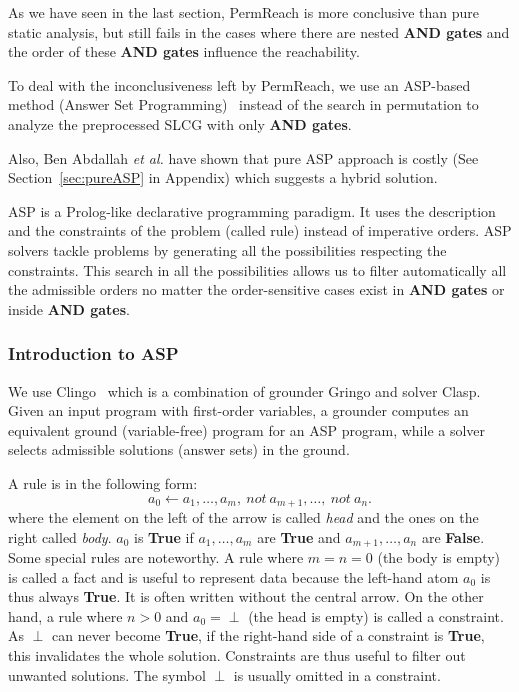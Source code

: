 As we have seen in the last section, PermReach is more conclusive than pure static analysis, but still fails in the cases where there are nested \textbf{AND gates} and the order of these \textbf{AND gates} influence the reachability.

To deal with the inconclusiveness left by PermReach, we use an ASP-based method (Answer Set Programming)~\cite{baral2003knowledge} instead of the search in permutation to analyze the preprocessed SLCG with only \textbf{AND gates}.

Also, Ben Abdallah \textit{et al.} \cite{abdallah2015exhaustive} have shown that pure ASP approach is costly (See Section~\ref{sec:pureASP} in Appendix) which suggests a hybrid solution.

ASP is a Prolog-like declarative programming paradigm.
It uses the description and the constraints of the problem (called rule) instead of imperative orders.
ASP solvers tackle problems by generating all the possibilities respecting the constraints. 
This search in all the possibilities allows us to filter automatically all the admissible orders no matter the order-sensitive cases exist in \textbf{AND gates} or inside \textbf{AND gates}.

\subsubsection{Introduction to ASP}\label{sec:introAsp}
We use Clingo~\cite{gebser2016theory} which is a combination of grounder Gringo and solver Clasp. 
Given an input program with first-order variables, a grounder computes an equivalent ground (variable-free) program for an ASP program, while a solver selects admissible solutions (answer sets) in the ground.

A rule is in the following form:
$$a_0 \gets a_1, \ldots , a_m,\ not\ a_{m+1}, \ldots,\ not\ a_n.$$
where the element on the left of the arrow is called \textit{head} and the ones on the right called \textit{body}.
$a_0$ is \textbf{True} if $a_1 , \ldots , a_m$ are \textbf{True} and $a_{m+1}, \ldots , a_n$ are \textbf{False}.
Some special rules are noteworthy. 
A rule where $m = n = 0$ (the body is empty) is called a fact and is useful to represent data because the left-hand atom $a_0$ is thus always \textbf{True}.
It is often written without the central arrow.
On the other hand, a rule where $n > 0$ and $a_0 = \perp$ (the head is empty) is called a constraint.
As $\perp$ can never become \textbf{True}, if the right-hand side of a constraint is \textbf{True}, this invalidates the whole solution.
Constraints are thus useful to filter out unwanted solutions.
The symbol $\perp$ is usually omitted in a constraint.


